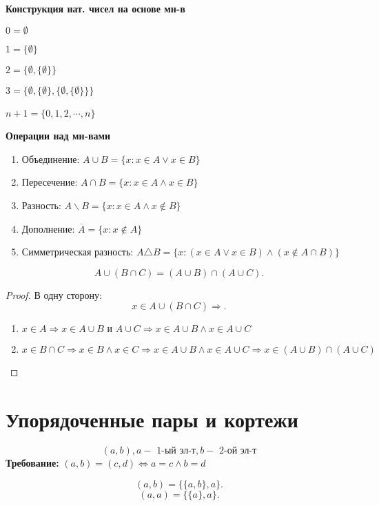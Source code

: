 \textbf{Конструкция нат. чисел на основе мн-в} 

$0 = \emptyset$

$1 = \{\emptyset\}$

$2 = \{\emptyset, \{\emptyset\}\}$

$3 = \{\emptyset, \{\emptyset\}, \{\emptyset, \{\emptyset\}\}\}$

$n + 1 = \{0, 1, 2, \cdots, n\}$
~\newline

\textbf{Операции над мн-вами}
\begin{enumerate}
    \item Объединение: $A \cup B = \{ x \colon x \in A \lor x \in B\}$
    \item Пересечение: $A \cap B = \{x \colon x \in A \land x \in B\}$ 
    \item Разность: $A \backslash B = \{x \colon x \in A \land x \not\in B\}$
    \item Дополнение: $\overline{A} = \{x \colon x \not\in A\}$
    \item Симметрическая разность: $A \triangle B = \{x \colon (x \in A \lor x \in B) \land (x \not\in A \cap B)\}$
\end{enumerate}

\begin{statement}
\[
A \cup (B \cap C) = (A \cup B) \cap (A \cup C)
.\] 
\end{statement}
\begin{proof}
    В одну сторону:
\[
x \in A \cup(B \cap C) \Rightarrow 
.\] 
\begin{enumerate}
    \item $x \in A \Rightarrow x \in A \cup B \text{ и } A \cup C \Rightarrow x \in A \cup B \land x \in A \cup C$
    \item $x \in B \cap C \Rightarrow x \in B \land x \in C \Rightarrow x \in A \cup B \land  x \in A \cup C \Rightarrow x \in (A \cup B) \cap (A \cup C)$
\end{enumerate}
\end{proof}

\section{Упорядоченные пары и кортежи}
\[
    (a, b), a - \text{ 1-ый эл-т}, b - \text{ 2-ой эл-т}
\]
\textbf{Требование: } $(a, b) = (c, d) \iff a = c \land b = d$

\begin{definition}
    \[
        (a, b) = \{\{a, b\}, a\}
.\] 
        \[
            (a, a) = \{\{a\}, a\}
        .\] 


\end{definition}
